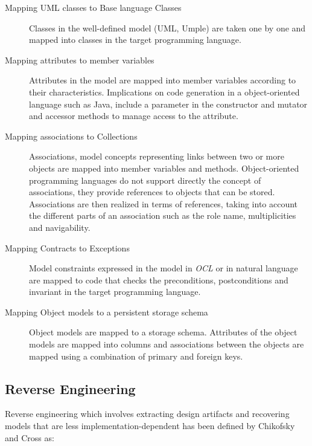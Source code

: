 \begin{description}

\item [Mapping UML classes to Base language Classes]
Classes in the well-defined model (UML, Umple) are taken one by one and mapped into classes in the target programming language. 
\item [Mapping attributes to member variables]
Attributes in the model are mapped into member variables according to their characteristics. Implications on code generation in a object-oriented language such as Java, include a parameter in the constructor and mutator and accessor methods to manage access to the attribute.
\item [Mapping associations to Collections]
Associations, model concepts representing links between two or more objects are mapped into member variables and methods. Object-oriented programming languages do not support directly the concept of associations, they provide references to objects that can be stored. Associations are then realized in terms of references, taking into account the different parts of an association such as the role name, multiplicities and navigability. 
\item [Mapping Contracts to Exceptions]
Model constraints expressed in the model in \textit{OCL} or in natural language are mapped to code that checks the preconditions, postconditions and invariant in the target programming language.
\item [Mapping Object models to a persistent storage schema]
Object models are mapped to a storage schema. Attributes of the object models are mapped into columns and associations between the objects are mapped using a combination of primary and foreign keys. 
\end{description}

\subsection{Reverse Engineering}

Reverse engineering which involves extracting design artifacts and recovering models that are less implementation-dependent has been defined by Chikofsky and Cross \cite{Chikofsky} as:


